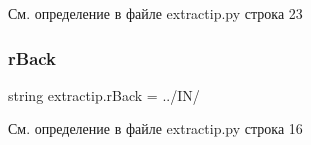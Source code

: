 См. определение в файле extractip.\+py строка 23

\mbox{\label{namespaceextractip_acbf601a19f64d09908d5ab149094b94d}} 
\subsubsection{\texorpdfstring{r\+Back}{rBack}}
{\footnotesize\ttfamily string extractip.\+r\+Back = \textquotesingle{}../IN/\textquotesingle{}}



См. определение в файле extractip.\+py строка 16

